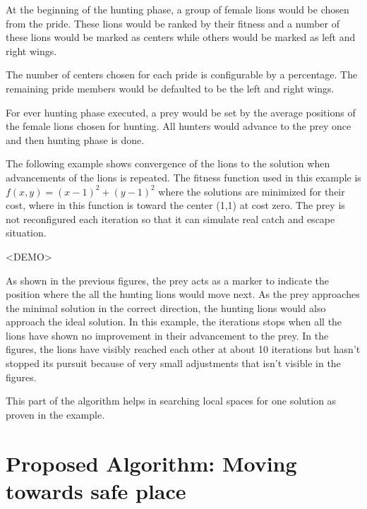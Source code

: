 At the beginning of the hunting phase, a group of female lions would be chosen from the pride. These lions would be ranked by their fitness and a number of these lions would be marked as centers while others would be marked as left and right wings.

The number of centers chosen for each pride is configurable by a percentage. The remaining pride members would be defaulted to be the left and right wings.

For ever hunting phase executed, a prey would be set by the average positions of the female lions chosen for hunting. All hunters would advance to the prey once and then hunting phase is done.

The following example shows convergence of the lions to the solution when advancements of the lions is repeated. The fitness function used in this example is $f(x,y) = (x-1)^2 + (y-1)^2$ where the solutions are minimized for their cost, where in this function is toward the center (1,1) at cost zero. The prey is not reconfigured each iteration so that it can simulate real catch and escape situation.

<DEMO>

As shown in the previous figures, the prey acts as a marker to indicate the position where the all the hunting lions would move next. As the prey approaches the minimal solution in the correct direction, the hunting lions would also approach the ideal solution. In this example, the iterations stops when all the lions have shown no improvement in their advancement to the prey. In the figures, the lions have visibly reached each other at about 10 iterations but hasn't stopped its pursuit because of very small adjustments that isn't visible in the figures.

This part of the algorithm helps in searching local spaces for one solution as proven in the example.

\section{Proposed Algorithm: Moving towards safe place}

